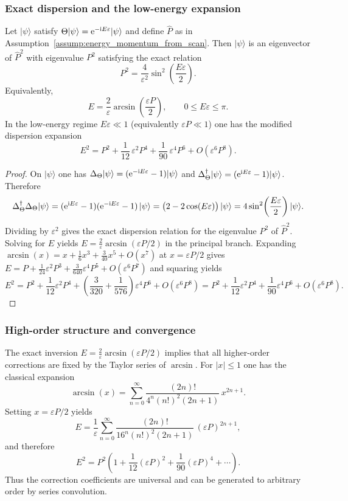 \subsubsection{Exact dispersion and the low-energy expansion}
\begin{proposition}
\label{prop:holographic_dispersion}
Let $|\psi\rangle$ satisfy $\Theta|\psi\rangle=\mathrm{e}^{-\mathrm{i} E\varepsilon}|\psi\rangle$ and define $\widehat{P}$ as in Assumption~\ref{assump:energy_momentum_from_scan}.
Then $|\psi\rangle$ is an eigenvector of $\widehat{P}^2$ with eigenvalue $P^2$ satisfying the exact relation
$$
P^2=\frac{4}{\varepsilon^2}\sin^2\!\left(\frac{E\varepsilon}{2}\right).
$$
Equivalently,
$$
E=\frac{2}{\varepsilon}\arcsin\!\left(\frac{\varepsilon P}{2}\right),
\qquad 0\le E\varepsilon\le \pi.
$$
In the low-energy regime $E\varepsilon\ll 1$ (equivalently $\varepsilon P\ll 1$) one has the modified dispersion expansion
$$
E^2
=P^2+\frac{1}{12}\,\varepsilon^2 P^4+\frac{1}{90}\,\varepsilon^4 P^6+O(\varepsilon^6 P^8).
$$
\end{proposition}

\begin{proof}
On $|\psi\rangle$ one has $\Delta_\Theta|\psi\rangle=(\mathrm{e}^{-\mathrm{i} E\varepsilon}-1)|\psi\rangle$ and $\Delta_\Theta^\dagger|\psi\rangle=(\mathrm{e}^{\mathrm{i} E\varepsilon}-1)|\psi\rangle$.
Therefore
$$
\Delta_\Theta^\dagger\Delta_\Theta|\psi\rangle
=(\mathrm{e}^{\mathrm{i} E\varepsilon}-1)(\mathrm{e}^{-\mathrm{i} E\varepsilon}-1)\,|\psi\rangle
=\big(2-2\cos(E\varepsilon)\big)\,|\psi\rangle
=4\sin^2\!\left(\frac{E\varepsilon}{2}\right)|\psi\rangle.
$$
Dividing by $\varepsilon^2$ gives the exact dispersion relation for the eigenvalue $P^2$ of $\widehat{P}^2$.
Solving for $E$ yields $E=\frac{2}{\varepsilon}\arcsin(\varepsilon P/2)$ in the principal branch.
Expanding $\arcsin(x)=x+\frac{1}{6}x^3+\frac{3}{40}x^5+O(x^7)$ at $x=\varepsilon P/2$ gives
$
E=P+\frac{1}{24}\varepsilon^2 P^3+\frac{3}{640}\varepsilon^4 P^5+O(\varepsilon^6 P^7)
$
and squaring yields
$$
E^2
=P^2+\frac{1}{12}\varepsilon^2 P^4+\left(\frac{3}{320}+\frac{1}{576}\right)\varepsilon^4 P^6+O(\varepsilon^6 P^8)
=P^2+\frac{1}{12}\varepsilon^2 P^4+\frac{1}{90}\varepsilon^4 P^6+O(\varepsilon^6 P^8).
$$
\end{proof}

\subsubsection{High-order structure and convergence}
\label{subsubsec:dispersion_convergence}
The exact inversion
$
E=\frac{2}{\varepsilon}\arcsin(\varepsilon P/2)
$
implies that all higher-order corrections are fixed by the Taylor series of $\arcsin$.
For $|x|\le 1$ one has the classical expansion
$$
\arcsin(x)=\sum_{n=0}^{\infty}\frac{(2n)!}{4^n (n!)^2 (2n+1)}\,x^{2n+1}.
$$
Setting $x=\varepsilon P/2$ yields
$$
E
=\frac{1}{\varepsilon}\sum_{n=0}^{\infty}\frac{(2n)!}{16^n (n!)^2 (2n+1)}\,(\varepsilon P)^{2n+1},
$$
and therefore
$$
E^2
=P^2\left(1+\frac{1}{12}(\varepsilon P)^2+\frac{1}{90}(\varepsilon P)^4+\cdots\right).
$$
Thus the correction coefficients are universal and can be generated to arbitrary order by series convolution.

